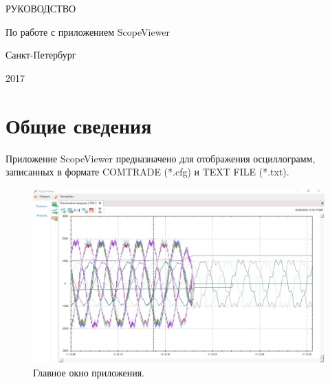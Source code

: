 \documentclass[a4paper,12pt]{article}
\begin{document}
\begin{titlepage}
\newpage


\begin{center}
\end{center}

\vspace{40ex}

\begin{center}
\LARGE РУКОВОДСТВО
\end{center}

\begin{center}
\Large По работе с приложением ScopeViewer
\end{center}

\vspace{55ex}

\begin{center}
\Large Санкт-Петербург
\end{center}

\begin{center}
\Large 2017
\end{center}

\end{titlepage}

\section*{\hspace{.5cm}Общие сведения }
\hspace{.5cm}Приложение ScopeViewer предназначено для отображения осциллограмм, записанных в формате COMTRADE (*.cfg) и TEXT FILE (*.txt). 

\begin{figure}[h]
\centering
\includegraphics[width=80ex]{image/MainWindow.jpg}
\caption{Главное окно приложения.}
\end{figure}
\end{document}
